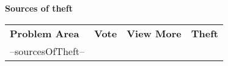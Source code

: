 \documentclass{article}
\begin{document}
\textcolor{primary}{\huge \textbf{Sources of theft}}
\setlength{\tabcolsep}{10pt} %
{\renewcommand{\arraystretch}{2}%
\begin{longtable}{p{215pt} p{80pt} p{60pt} p{100pt}} 
    \cellcolor{tableHeaderBg} \textbf{Problem Area} &
    \cellcolor{tableHeaderBg}  \centering \textbf{Vote} &
    \cellcolor{tableHeaderBg} \centering \textbf{View More} &
    \cellcolor{tableHeaderBg} \textbf{Theft} \\ 

    --sourcesOfTheft--
\end{longtable}
}
\end{document}
